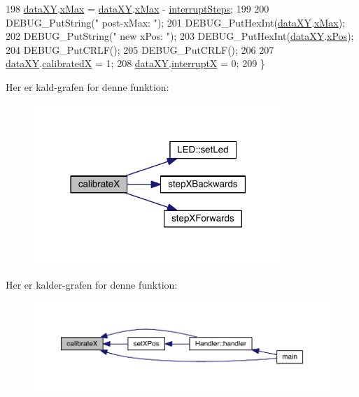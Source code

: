 \begin{DoxyCode}
198   \hyperlink{data_8h_a89d7998a721b3f36f9f4131e7a5e42d2}{dataXY}.\hyperlink{data_8h_a5b6ae90a32a5f290afcc50656befceca}{xMax} = \hyperlink{data_8h_a89d7998a721b3f36f9f4131e7a5e42d2}{dataXY}.\hyperlink{data_8h_a5b6ae90a32a5f290afcc50656befceca}{xMax} - \hyperlink{xy_8h_a319d8f8cbb816fc1ca2306587712b0b7}{interruptSteps};
199   
200   DEBUG\_PutString(\textcolor{stringliteral}{" post-xMax: "});
201   DEBUG\_PutHexInt(\hyperlink{data_8h_a89d7998a721b3f36f9f4131e7a5e42d2}{dataXY}.\hyperlink{data_8h_a5b6ae90a32a5f290afcc50656befceca}{xMax});
202   DEBUG\_PutString(\textcolor{stringliteral}{" new xPos: "});
203   DEBUG\_PutHexInt(\hyperlink{data_8h_a89d7998a721b3f36f9f4131e7a5e42d2}{dataXY}.\hyperlink{data_8h_a5262e09f478a571552e65be75c506bdb}{xPos});
204   DEBUG\_PutCRLF();
205   DEBUG\_PutCRLF();
206   
207   \hyperlink{data_8h_a89d7998a721b3f36f9f4131e7a5e42d2}{dataXY}.\hyperlink{data_8h_a20403c23f502143a2dd7ee5bb641c0ab}{calibratedX} = 1;
208   \hyperlink{data_8h_a89d7998a721b3f36f9f4131e7a5e42d2}{dataXY}.\hyperlink{data_8h_a4cacb2964bb4b589bf79aa64a398725b}{interruptX} = 0;
209 \}
\end{DoxyCode}


Her er kald-\/grafen for denne funktion\+:
\nopagebreak
\begin{figure}[H]
\begin{center}
\leavevmode
\includegraphics[width=267pt]{db/d87/class_x_y_a852d7d757cec8e85e0b436969d0ce237_cgraph}
\end{center}
\end{figure}




Her er kalder-\/grafen for denne funktion\+:
\nopagebreak
\begin{figure}[H]
\begin{center}
\leavevmode
\includegraphics[width=350pt]{db/d87/class_x_y_a852d7d757cec8e85e0b436969d0ce237_icgraph}
\end{center}
\end{figure}


